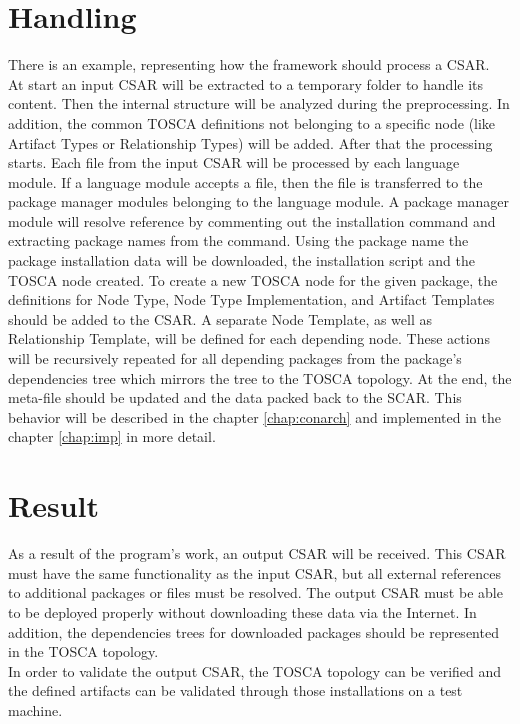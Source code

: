 \section*{Handling}
There is an example, representing how the framework should process a CSAR.\\
At start an input CSAR will be extracted to a temporary folder to handle its content.
Then the internal structure will be analyzed during the preprocessing. 
In addition, the common TOSCA definitions not belonging to a specific node (like Artifact Types or Relationship Types) will be added. 
After that the processing starts. 
Each file from the input CSAR will be processed by each language module.
If a language module accepts a file, then the file is transferred to the package manager modules belonging to the language module.
A package manager module will resolve reference by commenting out the installation command and extracting package names from the command.
Using the package name the package installation data will be downloaded, the installation script and the TOSCA node created. 
To create a new TOSCA node for the given package, the definitions for Node Type, Node Type Implementation, and Artifact Templates should be added to the CSAR. 
A separate Node Template, as well as Relationship Template, will be defined for each depending node.
These actions will be recursively repeated for all depending packages from the package's dependencies tree which mirrors the tree to the TOSCA topology.
At the end, the meta-file should be updated and the data packed back to the SCAR. %
This behavior will be described in the chapter \ref{chap:conarch} and implemented in the chapter \ref{chap:imp} in more detail.
\fi
\section*{Result}
As a result of the program's work, an output CSAR will be received.      
This CSAR must have the same functionality as the input CSAR, but all external references to additional packages or files must be resolved.
The output CSAR must be able to be deployed properly without downloading these data via the Internet. 
In addition, the dependencies trees for downloaded packages should be represented in the TOSCA topology. \\
In order to validate the output CSAR, the TOSCA topology can be verified and the defined artifacts can be validated through those installations on a test machine. 

